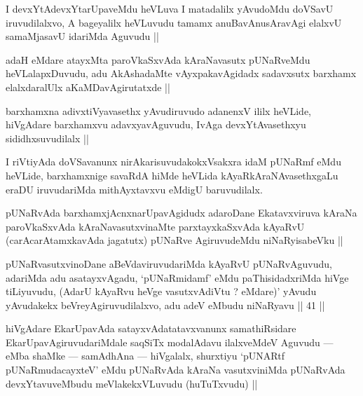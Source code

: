 
\begin{artha}
I devxYtAdevxYtarUpaveMdu heVLuva I matadalilx yAvudoMdu doVSavU iruvudilalxvo, A bageyalilx heVLuvudu tamamx anuBavAnusAravAgi elalxvU samaMjasavU idariMda Aguvudu ||
\end{artha}


\begin{artha}
adaH eMdare atayxMta paroVkaSxvAda kAraNavasutx pUNaRveMdu heVLalapxDuvudu, adu AkAshadaMte vAyxpakavAgidadx sadavxsutx barxhamx elalxdaralUlx aKaMDavAgirutatxde ||
\end{artha}

\begin{artha}
barxhamxna adivxtiVyavasethx yAvudiruvudo adanenxV ililx heVLide, hiVgAdare barxhamxvu adavxyavAguvudu, IvAga devxYtAvasethxyu sididhxsuvudilalx ||
\end{artha}

\begin{artha}
I riVtiyAda doVSavanunx nirAkarisuvudakokxVsakxra idaM pUNaRmf eMdu heVLide, barxhamxnige savaRdA hiMde heVLida kAyaRkAraNAvasethxgaLu eraDU iruvudariMda mithAyxtavxvu eMdigU baruvudilalx.
\end{artha}

\begin{artha}
pUNaRvAda barxhamxjAcnxnarUpavAgidudx adaroDane Ekatavxviruva kAraNa paroVkaSxvAda kAraNavasutxvinaMte parxtayxkaSxvAda kAyaRvU (carAcarAtamxkavAda jagatutx) pUNaRve AgiruvudeMdu niNaRyisabeVku ||
\end{artha}


\begin{artha}
pUNaRvasutxvinoDane aBeVdaviruvudariMda kAyaRvU pUNaRvAguvudu, adariMda adu asatayxvAgadu, `pUNaRmidamf' eMdu paThisidadxriMda hiVge tiLiyuvudu, (AdarU kAyaRvu heVge vasutxvAdiVtu ? eMdare)' yAvudu yAvudakekx beVreyAgiruvudilalxvo, adu adeV eMbudu niNaRyavu || 41 ||
\end{artha}


\begin{artha}
hiVgAdare EkarUpavAda satayxvAdatatavxvanunx samathiRsidare EkarUpavAgiruvudariMdale saqSiTx modalAdavu ilalxveMdeV Aguvudu --- eMba shaMke --- samAdhAna --- hiVgalalx, shurxtiyu `pUNARtf pUNaRmudacayxteV' eMdu pUNaRvAda kAraNa vasutxviniMda pUNaRvAda devxYtavuveMbudu meVlakekxVLuvudu (huTuTxvudu) ||
\end{artha}

